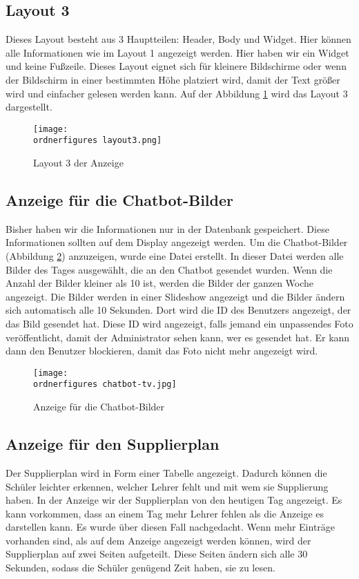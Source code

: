 \subsection{Layout 3}
Dieses Layout besteht aus 3 Hauptteilen: Header, Body und Widget. Hier können alle Informationen wie im Layout 1 angezeigt werden. Hier haben wir ein Widget und keine Fußzeile. Dieses Layout eignet sich für kleinere Bildschirme oder wenn der Bildschirm in einer bestimmten Höhe platziert wird, damit der Text größer wird und einfacher gelesen werden kann. Auf der Abbildung \ref{fi:layout3} wird das Layout 3 dargestellt.

\begin{figure}[H]
	\centering
	\texttt{[image: \\ordnerfigures layout3.png]}
	\caption{Layout 3 der Anzeige}
	\label{fi:layout3}
\end{figure}

\subsection{Anzeige für die Chatbot-Bilder}

Bisher haben wir die Informationen nur in der Datenbank gespeichert. Diese Informationen sollten auf dem Display angezeigt werden. Um die Chatbot-Bilder (Abbildung \ref{fi:chatbot}) anzuzeigen, wurde eine Datei erstellt. In dieser Datei werden alle Bilder des Tages ausgewählt, die an den Chatbot gesendet wurden. Wenn die Anzahl der Bilder kleiner als 10 ist, werden die Bilder der ganzen Woche angezeigt. Die Bilder werden in einer Slideshow angezeigt und die Bilder ändern sich automatisch alle 10 Sekunden.
Dort wird die ID des Benutzers angezeigt, der das Bild gesendet hat. Diese ID wird angezeigt, falls jemand ein unpassendes Foto veröffentlicht, damit der Administrator sehen kann, wer es gesendet hat. Er kann dann den Benutzer blockieren, damit das Foto nicht mehr angezeigt wird.

\begin{figure}[H]
	\centering
	\texttt{[image: \\ordnerfigures chatbot-tv.jpg]}
	\caption{Anzeige für die Chatbot-Bilder}
	\label{fi:chatbot}
\end{figure}

\subsection{Anzeige für den Supplierplan}

Der Supplierplan wird in Form einer Tabelle angezeigt. Dadurch können die Schüler leichter erkennen, welcher Lehrer fehlt und mit wem sie Supplierung haben. In der Anzeige wir der Supplierplan von den heutigen Tag angezeigt. Es kann vorkommen, dass an einem Tag mehr Lehrer fehlen als die Anzeige es darstellen kann. Es wurde über diesen Fall nachgedacht. Wenn mehr Einträge vorhanden sind, als auf dem Anzeige angezeigt werden  können, wird der Supplierplan auf zwei Seiten aufgeteilt. Diese Seiten ändern sich alle 30 Sekunden, sodass die Schüler genügend Zeit haben, sie zu lesen.

